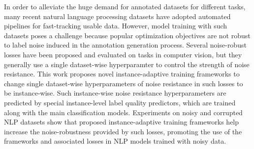 In order to alleviate the huge demand for annotated datasets for different tasks, many recent natural language processing datasets have adopted automated pipelines for fast-tracking usable data. However, model training with such datasets poses a challenge because popular optimization objectives are not robust to label noise induced in the annotation generation process. Several noise-robust losses have been proposed and evaluated on tasks in computer vision, but they generally use a single dataset-wise hyperparamter to control the strength of noise resistance. This work proposes novel instance-adaptive training frameworks to change single dataset-wise hyperparameters of noise resistance in such losses to be instance-wise.  Such instance-wise noise resistance hyperparameters are predicted by special instance-level label quality predictors, which are trained along with the main classification models. Experiments on noisy and corrupted NLP datasets show that proposed instance-adaptive training frameworks help increase the noise-robustness provided by such losses, promoting the use of the frameworks and associated losses in NLP models trained with noisy data.
